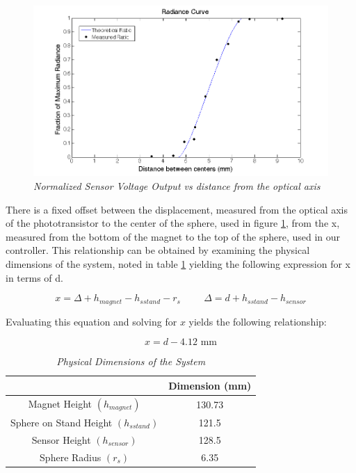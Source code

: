 \documentclass{article}
\theoremstyle{plain}
\theoremstyle{definition}
\theoremstyle{remark}
\begin{document}
\begin{figure}
\begin{center}
\includegraphics[width = 15cm]{SensorRadianceCurve.png}
\caption{\emph{Normalized Sensor Voltage Output vs distance from the optical axis}}
\label{Q1_d1}
\end{center}
\end{figure}

There is a fixed offset between the displacement, measured from the optical axis of the phototransistor to the center of the sphere, used in figure \ref{Q1_d1}, from the x, measured from the bottom of the magnet to the top of the sphere, used in our controller.  This relationship can be obtained by examining the physical dimensions of the system, noted in table \ref{Q1_dt2} yielding the following expression for x in terms of d.

$$ x = \Delta + h_{magnet} - h_{s stand} - r_{s} \hspace{1cm} \Delta = d + h_{s stand} - h_{sensor} $$

Evaluating this equation and solving for $x$ yields the following relationship:

$$ x = d - 4.12 \text{ mm} $$

\begin{table}
\begin{center}
    \begin{tabular}{|c|c|}
        \hline
        ~                                    & Dimension (mm) \\ \hline
        Magnet Height $(h_{magnet}) $          & 130.73         \\ 
        Sphere on Stand Height $(h_{s stand})$ & 121.5          \\ 
        Sensor Height $(h_{sensor})$           & 128.5          \\ 
        Sphere Radius $(r_{s})$                & 6.35           \\
        \hline
    \end{tabular}
\caption{\emph{Physical Dimensions of the System}}
\label{Q1_dt2}
\end{center}
\end{table}
\end{document}
